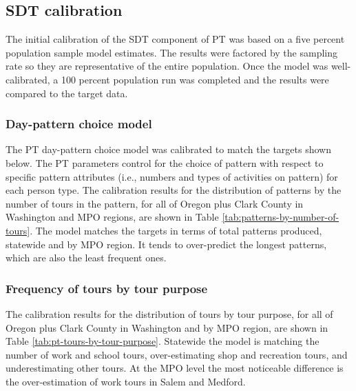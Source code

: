 \subsection{SDT calibration}
The initial calibration of the SDT component of PT was based on a five percent population sample model estimates. The results were factored by the sampling rate so they are representative of the entire population. Once the model was well-calibrated, a 100 percent population run was completed and the results were compared to the target data.

\subsubsection{Day-pattern choice model}
The PT day-pattern choice model was calibrated to match the targets shown below. The PT parameters control for the choice of pattern with respect to specific pattern attributes (i.e., numbers and types of activities on pattern) for each person type. 
The calibration results for the distribution of patterns by the number of tours in the pattern, for all of Oregon plus Clark County in Washington and MPO regions, are shown in Table \ref{tab:patterns-by-number-of-tours}. The model matches the targets in terms of total patterns produced, statewide and by MPO region. It tends to over-predict the longest patterns, which are also the least frequent ones.


\subsubsection{Frequency of tours by tour purpose}
The calibration results for the distribution of tours by tour purpose, for all of Oregon plus Clark County in Washington and by MPO region, are shown in Table \ref{tab:pt-tours-by-tour-purpose}. Statewide the model is matching the number of work and school tours, over-estimating shop and recreation tours, and underestimating other tours. At the MPO level the most noticeable difference is the over-estimation of work tours in Salem and Medford.



